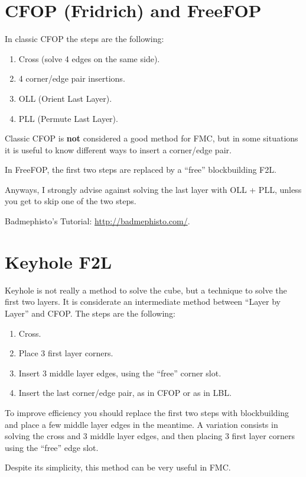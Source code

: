 \documentclass[11pt,a4paper]{book}
\begin{document}
\section{CFOP (Fridrich) and FreeFOP}
In classic CFOP the steps are the following:
\begin{enumerate}
\item Cross (solve 4 edges on the same side).
\item 4 corner/edge pair insertions.
\item OLL (Orient Last Layer).
\item PLL (Permute Last Layer).
\end{enumerate}

Classic CFOP is \textbf{not} considered a good method for FMC, but in some situations it is useful to know different ways to insert a corner/edge pair.

In FreeFOP, the first two steps are replaced by a ``free'' blockbuilding F2L.

Anyways, I strongly advise against solving the last layer with OLL + PLL, unless you get to skip one of the two steps.

Badmephisto's Tutorial: \url{http://badmephisto.com/}.

\section{Keyhole F2L}

Keyhole is not really a method to solve the cube, but a technique to solve the first two layers. It is considerate an intermediate method between “Layer by Layer” and CFOP. The steps are the following:
\begin{enumerate}
\item Cross.
\item Place 3 first layer corners.
\item Insert 3 middle layer edges, using the ``free'' corner slot.
\item Insert the last corner/edge pair, as in CFOP or as in LBL.
\end{enumerate}

To improve efficiency you should replace the first two steps with blockbuilding and place a few middle layer edges in the meantime. A variation consists in solving the cross and 3 middle layer edges, and then placing 3 first layer corners using the ``free'' edge slot.

Despite its simplicity, this method can be very useful in FMC.
\end{document}

